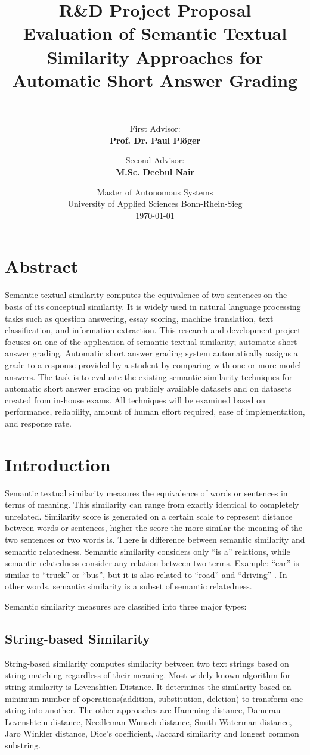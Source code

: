 \documentclass{article}
\title{\Large{R\&D Project Proposal}\\
\vspace{0.8cm}
\textbf{Evaluation of Semantic Textual Similarity Approaches for Automatic Short Answer Grading}\\
[15mm]}
\author{\makebox[.9\textwidth]{\textbf{Ramesh Kumar}}\\
[10mm]
 \and First Advisor:\\
 [2mm]\textbf{Prof. Dr. Paul Pl\"oger} \and Second Advisor:\\
  [2mm]\textbf{M.Sc. Deebul Nair}\\
  [30mm] }
\date{Master of Autonomous Systems  \\ 
[2mm]
University of Applied Sciences Bonn-Rhein-Sieg \\
[25mm]
\today}
\begin{document}
\maketitle
\thispagestyle{empty}
\newpage
\section*{Abstract}

Semantic textual similarity computes the equivalence of two sentences on the basis of its conceptual similarity. It is widely used in natural language processing tasks such as question answering, essay scoring, machine translation, text classification, and information extraction. This research and development project focuses on one of the application of semantic textual similarity; automatic short answer grading. Automatic short answer grading system automatically assigns a grade to a response provided by a student by comparing with one or more model answers. The task is to evaluate the existing semantic similarity techniques for automatic short answer grading  on publicly available datasets and on datasets created from in-house exams. All techniques will be examined based on performance, reliability, amount of human effort required, ease of implementation, and response rate.

\newpage
\section{Introduction}

Semantic textual similarity measures the equivalence of words or sentences in terms of meaning.	
This similarity can range from exactly identical to completely unrelated. Similarity score is generated on a certain scale to represent distance between words or sentences, higher the score the more similar the meaning of the two sentences or two words is. There is difference between semantic similarity and semantic relatedness. Semantic similarity considers only ``is a'' relations, while semantic relatedness consider any relation between two terms. Example: ``car'' is similar to ``truck'' or ``bus'', but it is also related to ``road'' and ``driving'' \cite{similarity}. In other words, semantic similarity is a subset of semantic relatedness.


Semantic similarity measures are classified into three major types: 
	\subsection{String-based Similarity}
	String-based similarity computes similarity between two text strings based on string matching regardless of their meaning. Most widely known algorithm for string similarity is Levenshtien Distance\cite{wikiString}. It determines the similarity based on  minimum number of operations(addition, substitution, deletion) to transform one string into another. The other approaches are Hamming distance, Damerau-Levenshtein distance,
Needleman-Wunsch distance, Smith-Waterman distance,
Jaro Winkler distance, Dice’s coefficient, Jaccard similarity and longest common substring\cite{survey}.
	
\end{document}
